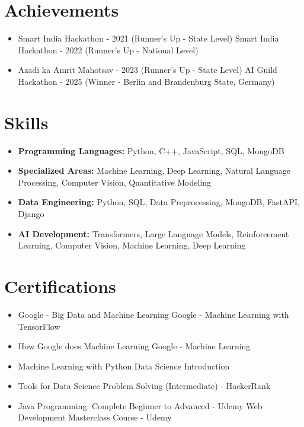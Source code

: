 \documentclass[a4paper,10pt]{article}
\begin{document}
\section*{Achievements}
\begin{itemize}
\item Smart India Hackathon - 2021 (Runner's Up - State Level) \hfill Smart India Hackathon - 2022 (Runner's Up - National Level)
\item Azadi ka Amrit Mahotsav - 2023 (Runner's Up - State Level) \hfill AI Guild Hackathon - 2025 (Winner - Berlin and Brandenburg State, Germany)
\end{itemize}

\section*{Skills}
\begin{itemize}
  \item \textbf{Programming Languages:} Python, C++, JavaScript, SQL, MongoDB
  \item \textbf{Specialized Areas:} Machine Learning, Deep Learning, Natural Language Processing, Computer Vision, Quantitative Modeling
  \item \textbf{Data Engineering:} Python, SQL, Data Preprocessing, MongoDB, FastAPI, Django
  \item \textbf{AI Development:} Transformers, Large Language Models, Reinforcement Learning, Computer Vision, Machine Learning, Deep Learning
\end{itemize}

\section*{Certifications}
\begin{itemize}
\item Google - Big Data and Machine Learning \hfill Google - Machine Learning with TensorFlow
\item How Google does Machine Learning \hfill Google - Machine Learning
\item Machine Learning with Python \hfill Data Science Introduction
\item Tools for Data Science \hfill Problem Solving (Intermediate) - HackerRank
\item Java Programming: Complete Beginner to Advanced - Udemy \hfill Web Development Masterclass Course - Udemy
\end{itemize}
\end{document}

